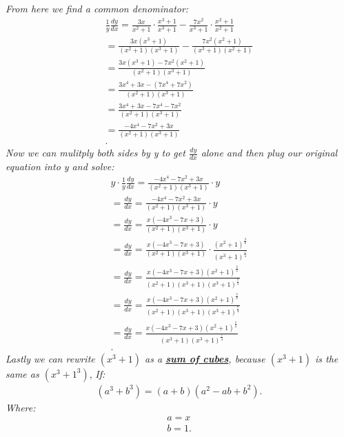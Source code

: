 \documentclass{report}
\begin{document}
    \pagebreak \bigbreak \noindent
    \begin{mdframed}
        \textit{From here we find a common denominator:}
        \begin{align*}
            \frac{1}{y}\frac{dy}{dx} = \frac{3x}{x^{2}+1}\cdot \frac{x^{3}+1}{x^{3}+1} - \frac{7x^{2}}{x^{3}+1} \cdot \frac{x^{2}+1}{x^{2}+1} \\
            = \frac{3x(x^{3}+1)}{(x^{2}+1)(x^{3}+1)} - \frac{7x^{2}(x^{2}+1)}{(x^{3}+1)(x^{2}+1)} \\
            = \frac{3x(x^{3}+1)-7x^{2}(x^{2}+1)}{(x^{2}+1)(x^{3}+1)} \\
            = \frac{3x^{4}+3x -(7x^{4}+7x^{2})}{(x^{2}+1)(x^{3}+1)} \\
            = \frac{3x^{4}+3x -7x^{4}-7x^{2}}{(x^{2}+1)(x^{3}+1)} \\
            = \frac{-4x^{4}-7x^{2}+3x}{(x^{2}+1)(x^{3}+1)} \\
        .\end{align*}
        \bigbreak \noindent 
        \textit{Now we can mulitply both sides by y to get $\frac{dy}{dx}$ alone and then plug our original equation into y and solve:}
        \begin{align*}
           y \cdot \frac{1}{y} \frac{dy}{dx} = \frac{-4x^{4}-7x^{2}+3x}{(x^{2}+1)(x^{3}+1)} \cdot y \\
           = \frac{dy}{dx} = \frac{-4x^{4}-7x^{2}+3x}{(x^{2}+1)(x^{3}+1)} \cdot y \\
           = \frac{dy}{dx} = \frac{x(-4x^{3}-7x+3)}{(x^{2}+1)(x^{3}+1)} \cdot y \\
           = \frac{dy}{dx} = \frac{x(-4x^{3}-7x+3)}{(x^{2}+1)(x^{3}+1)} \cdot \frac{(x^{2}+1)^{\frac{3}{2}}}{(x^{3}+1)^{\frac{7}{4}}} \\
           = \frac{dy}{dx} = \frac{x(-4x^{3}-7x+3)(x^{2}+1)^{\frac{3}{2}}}{(x^{2}+1)(x^{3}+1)(x^{3}+1)^{\frac{7}{4}}}  \\
           = \frac{dy}{dx} = \frac{x(-4x^{3}-7x+3)(x^{2}+1)^{\frac{3}{2}}}{(x^{2}+1)(x^{3}+1)(x^{3}+1)^{\frac{7}{4}}} \\
           = \frac{dy}{dx} = \frac{x(-4x^{3}-7x+3)(x^{2}+1)^{\frac{1}{2}}}{(x^{3}+1)(x^{3}+1)^{\frac{7}{4}}} \\
       .\end{align*}
       \bigbreak \noindent 
       \textit{Lastly we can rewrite $(x^{3}+1)$ as a \textbf{\textit{\underline{sum of cubes}}}, because $(x^{3}+1)$ is the same as $(x^{3}+1^{3})$},
       \bigbreak \noindent 
       \textit{If:}
       \begin{align*}
           (a^{3}+b^{3}) = (a+b)(a^{2}-ab+b^{2})
       .\end{align*}
       \textit{Where:}
       \begin{align*}
           a = x \\
           b = 1
       .\end{align*}
    \end{mdframed}
\end{document}
